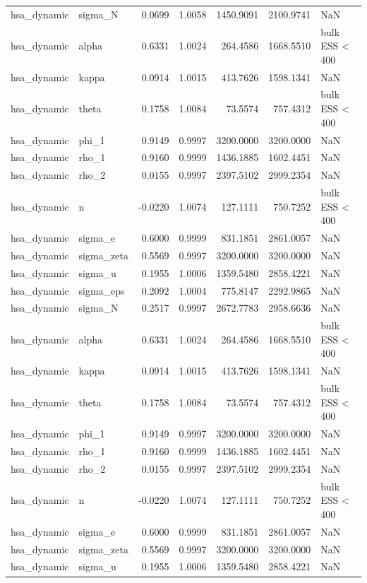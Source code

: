 \begin{tabular}{llrrrrl}
hsa\_dynamic & sigma\_N & 0.0699 & 1.0058 & 1450.9091 & 2100.9741 & NaN \\
hsa\_dynamic & alpha & 0.6331 & 1.0024 & 264.4586 & 1668.5510 & bulk ESS < 400 \\
hsa\_dynamic & kappa & 0.0914 & 1.0015 & 413.7626 & 1598.1341 & NaN \\
hsa\_dynamic & theta & 0.1758 & 1.0084 & 73.5574 & 757.4312 & bulk ESS < 400 \\
hsa\_dynamic & phi\_1 & 0.9149 & 0.9997 & 3200.0000 & 3200.0000 & NaN \\
hsa\_dynamic & rho\_1 & 0.9160 & 0.9999 & 1436.1885 & 1602.4451 & NaN \\
hsa\_dynamic & rho\_2 & 0.0155 & 0.9997 & 2397.5102 & 2999.2354 & NaN \\
hsa\_dynamic & n & -0.0220 & 1.0074 & 127.1111 & 750.7252 & bulk ESS < 400 \\
hsa\_dynamic & sigma\_e & 0.6000 & 0.9999 & 831.1851 & 2861.0057 & NaN \\
hsa\_dynamic & sigma\_zeta & 0.5569 & 0.9997 & 3200.0000 & 3200.0000 & NaN \\
hsa\_dynamic & sigma\_u & 0.1955 & 1.0006 & 1359.5480 & 2858.4221 & NaN \\
hsa\_dynamic & sigma\_eps & 0.2092 & 1.0004 & 775.8147 & 2292.9865 & NaN \\
hsa\_dynamic & sigma\_N & 0.2517 & 0.9997 & 2672.7783 & 2958.6636 & NaN \\
hsa\_dynamic & alpha & 0.6331 & 1.0024 & 264.4586 & 1668.5510 & bulk ESS < 400 \\
hsa\_dynamic & kappa & 0.0914 & 1.0015 & 413.7626 & 1598.1341 & NaN \\
hsa\_dynamic & theta & 0.1758 & 1.0084 & 73.5574 & 757.4312 & bulk ESS < 400 \\
hsa\_dynamic & phi\_1 & 0.9149 & 0.9997 & 3200.0000 & 3200.0000 & NaN \\
hsa\_dynamic & rho\_1 & 0.9160 & 0.9999 & 1436.1885 & 1602.4451 & NaN \\
hsa\_dynamic & rho\_2 & 0.0155 & 0.9997 & 2397.5102 & 2999.2354 & NaN \\
hsa\_dynamic & n & -0.0220 & 1.0074 & 127.1111 & 750.7252 & bulk ESS < 400 \\
hsa\_dynamic & sigma\_e & 0.6000 & 0.9999 & 831.1851 & 2861.0057 & NaN \\
hsa\_dynamic & sigma\_zeta & 0.5569 & 0.9997 & 3200.0000 & 3200.0000 & NaN \\
hsa\_dynamic & sigma\_u & 0.1955 & 1.0006 & 1359.5480 & 2858.4221 & NaN \\

\end{tabular}
